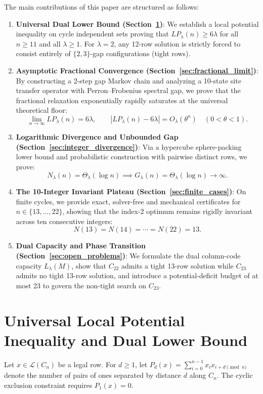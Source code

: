 \documentclass[11pt,a4paper]{article}
\theoremstyle{definition}
\theoremstyle{remark}
\begin{document}
The main contributions of this paper are structured as follows:
\begin{enumerate}
    \item \textbf{Universal Dual Lower Bound (Section~\ref{sec:lower_bound})}: We establish a local potential inequality on cycle independent sets proving that $LP_\lambda(n) \ge 6\lambda$ for all $n \ge 11$ and all $\lambda \ge 1$. For $\lambda = 2$, any 12-row solution is strictly forced to consist entirely of $\{2, 3\}$-gap configurations (tight rows).
    \item \textbf{Asymptotic Fractional Convergence (Section~\ref{sec:fractional_limit})}: By constructing a 2-step gap Markov chain and analyzing a 10-state site transfer operator with Perron--Frobenius spectral gap, we prove that the fractional relaxation exponentially rapidly saturates at the universal theoretical floor:
    \[
        \lim_{n \to \infty} LP_\lambda(n) = 6\lambda, \qquad |LP_\lambda(n) - 6\lambda| = O_\lambda(\theta^n) \quad (0 < \theta < 1).
    \]
    \item \textbf{Logarithmic Divergence and Unbounded Gap (Section~\ref{sec:integer_divergence})}: Via a hypercube sphere-packing lower bound and probabilistic construction with pairwise distinct rows, we prove:
    \[
        N_\lambda(n) = \Theta_\lambda(\log n) \implies G_\lambda(n) = \Theta_\lambda(\log n) \longrightarrow \infty.
    \]
    \item \textbf{The 10-Integer Invariant Plateau (Section~\ref{sec:finite_cases})}: On finite cycles, we provide exact, solver-free and mechanical certificates for $n \in \{13, \dots, 22\}$, showing that the index-2 optimum remains rigidly invariant across ten consecutive integers:
    \[
        N(13) = N(14) = \cdots = N(22) = 13.
    \]
    \item \textbf{Dual Capacity and Phase Transition (Section~\ref{sec:open_problems})}: We formulate the dual column-code capacity $L_\lambda(M)$, show that $C_{22}$ admits a tight 13-row solution while $C_{23}$ admits no tight 13-row solution, and introduce a potential-deficit budget of at most 23 to govern the non-tight search on $C_{23}$.
\end{enumerate}

\section{Universal Local Potential Inequality and Dual Lower Bound}
\label{sec:lower_bound}

Let $x \in \mathcal{L}(C_n)$ be a legal row. For $d \ge 1$, let $P_d(x) = \sum_{i=0}^{n-1} x_i x_{i+d \pmod n}$ denote the number of pairs of ones separated by distance $d$ along $C_n$. The cyclic exclusion constraint requires $P_1(x) = 0$.
\end{document}
